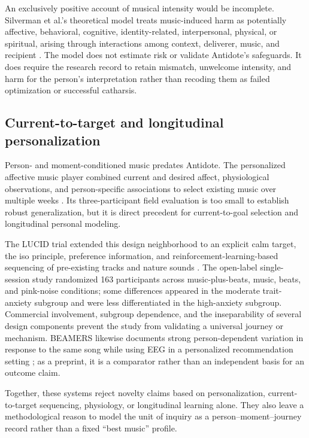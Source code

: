 An exclusively positive account of musical intensity would be incomplete.
Silverman et al.'s theoretical model treats music-induced harm as potentially
affective, behavioral, cognitive, identity-related, interpersonal, physical,
or spiritual, arising through interactions among context, deliverer, music,
and recipient \citep{silverman2020complicated}. The model does not estimate
risk or validate Antidote's safeguards. It does require the research record to
retain mismatch, unwelcome intensity, and harm for the person's interpretation
rather than recoding them as failed optimization or successful catharsis.

\subsection{Current-to-target and longitudinal personalization}
\label{sec:related-personalization}

Person- and moment-conditioned music predates Antidote. The personalized
affective music player combined current and desired affect, physiological
observations, and person-specific associations to select existing music over
multiple weeks \citep{janssen2012tune}. Its three-participant field evaluation
is too small to establish robust generalization, but it is direct precedent for
current-to-goal selection and longitudinal personal modeling.

The LUCID trial extended this design neighborhood to an explicit calm target,
the iso principle, preference information, and reinforcement-learning-based
sequencing of pre-existing tracks and nature sounds
\citep{mallik2022effects}. The open-label single-session study randomized 163
participants across music-plus-beats, music, beats, and pink-noise conditions;
some differences appeared in the moderate trait-anxiety subgroup and were less
differentiated in the high-anxiety subgroup. Commercial involvement, subgroup
dependence, and the inseparability of several design components prevent the
study from validating a universal journey or mechanism. BEAMERS likewise
documents strong person-dependent variation in response to the same song while
using EEG in a personalized recommendation setting \citep{li2022beamers}; as a
preprint, it is a comparator rather than an independent basis for an outcome
claim.

Together, these systems reject novelty claims based on personalization,
current-to-target sequencing, physiology, or longitudinal learning alone. They
also leave a methodological reason to model the unit of inquiry as a
person--moment--journey record rather than a fixed ``best music'' profile.

